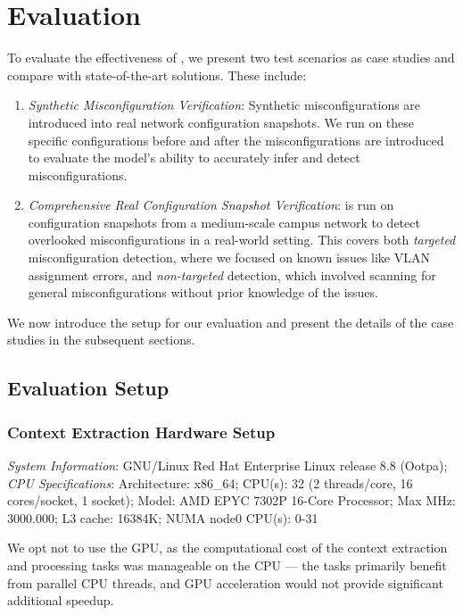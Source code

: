 \section{Evaluation}
\label{sec:eval}
To evaluate the effectiveness of \sysname{}, we present two test scenarios as case studies and compare \sysname{} with state-of-the-art solutions. These include:

\begin{enumerate}
    \item \textit{Synthetic Misconfiguration Verification}: Synthetic misconfigurations are introduced into real network configuration snapshots. We run \sysname{} on these specific configurations before and after the misconfigurations are introduced to evaluate the model’s ability to accurately infer and detect misconfigurations.
    \item \textit{Comprehensive Real Configuration Snapshot Verification}: \sysname{} is run on configuration snapshots from a medium-scale campus network to detect overlooked misconfigurations in a real-world setting. This covers both \textit{targeted} misconfiguration detection, where we focused on known issues like VLAN assignment errors, and \textit{non-targeted} detection, which involved scanning for general misconfigurations without prior knowledge of the issues.
\end{enumerate}

We now introduce the setup for our evaluation and present the details of the case studies in the subsequent sections.


\subsection{Evaluation Setup}
\subsubsection{Context Extraction Hardware Setup}


\textit{System Information}: GNU/Linux Red Hat Enterprise Linux release 8.8 (Ootpa); 
\textit{CPU Specifications}: Architecture: x86\_64; CPU(s): 32 (2 threads/core, 16 cores/socket, 1 socket); Model: AMD EPYC 7302P 16-Core Processor; Max MHz: 3000.000; L3 cache: 16384K; NUMA node0 CPU(s): 0-31 

We opt not to use the GPU, as the computational cost of the context extraction and processing tasks was manageable on the CPU --- the tasks primarily benefit from parallel CPU threads, and GPU acceleration would not provide significant additional speedup.


